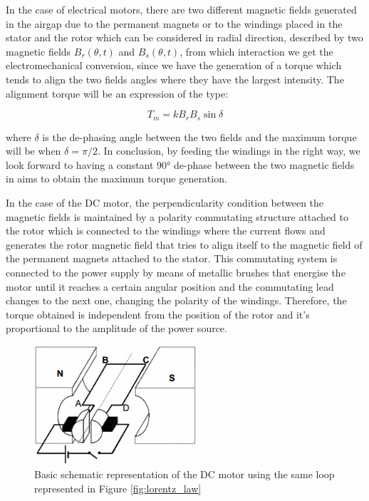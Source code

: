 \begin{description}
In the case of electrical motors, there are two different magnetic fields generated in the airgap due to the permanent magnets or to the windings placed in the stator and the rotor which can be considered in radial direction, described by two magnetic fields $B_{r}(\theta,t)$ and $B_{s}(\theta,t)$, from which interaction we get the electromechanical conversion, since we have the generation of a torque which tends to align the two fields angles where they have the largest intensity. The alignment torque will be an expression of the type:

\begin{equation}
	\label{eq:torque_2}
	T_{m} = k B_{r} B_{s} \sin \delta
\end{equation}

where $\delta$ is the de-phasing angle between the two fields and the maximum torque will be when $\delta = \pi / 2$. In conclusion, by feeding the windings in the right way, we look forward to having a constant 90° de-phase between the two magnetic fields in aims to obtain the maximum torque generation.


\end{description}

In the case of the \acf{DC} motor, the perpendicularity condition between the magnetic fields is maintained by a polarity commutating structure attached to the rotor which is connected to the windings where the current flows and generates the rotor magnetic field that tries to align itself to the magnetic field of the permanent magnets attached to the stator. This commutating system is connected to the power supply by means of metallic brushes that energise the motor until it reaches a certain angular position and the commutating lead changes to the next one, changing the polarity of the windings. Therefore, the torque obtained is independent from the position of the rotor and it’s proportional to the amplitude of the power source.

\begin{figure}[htbp]
\centering
\includegraphics[width=6cm]{Images/dc_motor.png} 
\caption[DC Motor Scheme]{Basic schematic representation of the \ac{DC} motor using the same loop represented in Figure \ref{fig:lorentz_law}}
\label{fig:dc_motor}
\end{figure}

